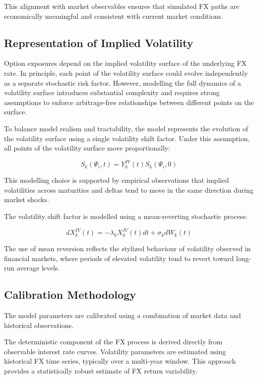 This alignment with market observables ensures that simulated FX paths are economically meaningful and consistent with current market conditions.

\subsection{Representation of Implied Volatility}

Option exposures depend on the implied volatility surface of the underlying FX rate. In principle, each point of the volatility surface could evolve independently as a separate stochastic risk factor. However, modelling the full dynamics of a volatility surface introduces substantial complexity and requires strong assumptions to enforce arbitrage-free relationships between different points on the surface.

To balance model realism and tractability, the model represents the evolution of the volatility surface using a single volatility shift factor. Under this assumption, all points of the volatility surface move proportionally:

\begin{equation}
	S_k(\Psi_i,t) = Y_k^{IV}(t)S_k(\Psi_i,0)
\end{equation}

This modelling choice is supported by empirical observations that implied volatilities across maturities and deltas tend to move in the same direction during market shocks.

The volatility shift factor is modelled using a mean-reverting stochastic process:

\begin{equation}
	dX_k^{IV}(t) = -\lambda_k X_k^{IV}(t)dt + \sigma_k dW_k(t)
\end{equation}

The use of mean reversion reflects the stylized behaviour of volatility observed in financial markets, where periods of elevated volatility tend to revert toward long-run average levels.

\subsection{Calibration Methodology}

The model parameters are calibrated using a combination of market data and historical observations.

The deterministic component of the FX process is derived directly from observable interest rate curves. Volatility parameters are estimated using historical FX time series, typically over a multi-year window. This approach provides a statistically robust estimate of FX return variability.

